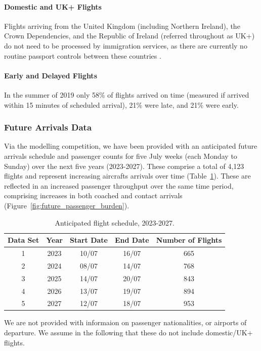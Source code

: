 \documentclass[10pt]{article}
\begin{document}
\paragraph{Domestic and UK+ Flights} Flights arriving from the United Kingdom (including Northern Ireland), the Crown Dependencies, and the Republic of Ireland (referred throughout as UK+) do not need to be processed by immigration services, as there are currently no routine passport controls between these countries \cite{common_travel_area}.

\paragraph{Early and Delayed Flights}
In the summer of 2019 only 58\% of flights arrived on time (measured if arrived within 15 minutes of scheduled arrival), 21\% were late, and 21\% were early. 

\subsubsection{Future Arrivals Data}
Via the modelling competition, we have been provided with an anticipated future arrivals schedule and passenger counts for five July weeks (each Monday to Sunday) over the next five years (2023-2027). These comprise a total of 4,123 flights and represent increasing aircrafts arrivals over time (Table~\ref{tab:future_arrivals_overview}). These are reflected in an increased passenger throughput over the same time period, comprising increases in both coached and contact arrivals (Figure~\ref{fig:future_passenger_burden}).
\begin{table}[!ht]
\caption{Anticipated flight schedule, 2023-2027.}
\label{tab:future_arrivals_overview}
\centering
\begin{tabular}{ccccc}
\hline
\multicolumn{1}{c}{\textbf{Data Set}} & \textbf{Year} & \textbf{Start Date} & \textbf{End Date} & \textbf{Number of Flights} \\ \hline
1  & 2023  & 10/07  & 16/07     & 665   \\
2  & 2024  & 08/07  & 14/07     & 768   \\
3  & 2025  & 14/07  & 20/07     & 843   \\
4  & 2026  & 13/07  & 19/07     & 894   \\
5  & 2027  & 12/07  & 18/07     & 953   \\ \hline
\end{tabular}
\end{table}
We are not provided with informaion on passenger nationalities, or airports of departure. We assume in the following that these do not include domestic/UK+ flights. 
\end{document}

